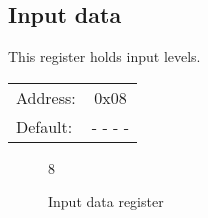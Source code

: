 \documentclass{article}
\begin{document}
	\subsection{Input data}

		This register holds input levels.

		\begin{tabular}{ l c }
			Address: & 0x08 \\
			Default: & - - - - \\
		\end{tabular}

		\begin{figure}[H]
			\centering
			\begin{bytefield}[
				bitwidth=0.1\linewidth]{8}
				 \\
			\end{bytefield}
			\caption{Input data register}
			\label{reg:input_value}
		\end{figure}
\end{document}
